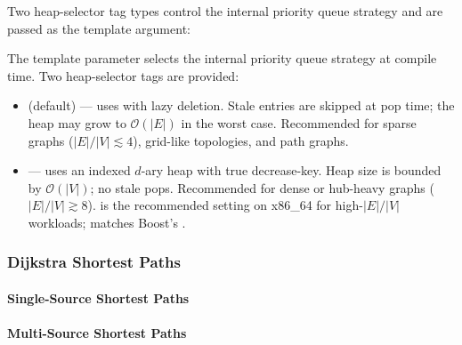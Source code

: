 Two heap-selector tag types control the internal priority queue strategy and are passed as the
 template argument:
{\small
      
}

The  template parameter selects the internal priority queue strategy at compile time.
Two heap-selector tags are provided:
\begin{itemize}
      \item {} (default) --- uses  with lazy deletion.
            Stale entries are skipped at pop time; the heap may grow to $\mathcal{O}(|E|)$ in the worst case.
            Recommended for sparse graphs ($|E|/|V| \lesssim 4$), grid-like topologies, and path graphs.
      \item {} --- uses an indexed $d$-ary heap with true decrease-key.
            Heap size is bounded by $\mathcal{O}(|V|)$; no stale pops.
            Recommended for dense or hub-heavy graphs ($|E|/|V| \gtrsim 8$).
             is the recommended setting on x86\_64 for high-$|E|/|V|$ workloads;
             matches Boost's .
\end{itemize}

\subsubsection{Dijkstra Shortest Paths}


\paragraph{Single-Source Shortest Paths}
{\small
      
}

\paragraph{Multi-Source Shortest Paths}
{\small
      
}


